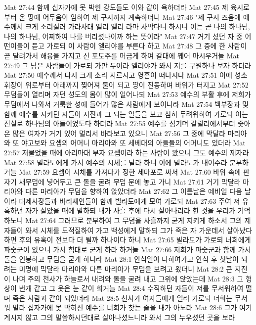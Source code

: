 Mat 27:44  함께 십자가에 못 박힌 강도들도 이와 같이 욕하더라
Mat 27:45  제 육시로부터 온 땅에 어두움이 임하여 제 구시까지 계속하더니
Mat 27:46  "제 구시 즈음에 예수께서 크게 소리질러 가라사대 엘리 엘리 라마 사박다니 하시니 이는 곧 나의 하나님, 나의 하나님, 어찌하여 나를 버리셨나이까 하는 뜻이라"
Mat 27:47  거기 섰던 자 중 어떤이들이 듣고 가로되 이 사람이 엘리야를 부른다 하고
Mat 27:48  그 중에 한 사람이 곧 달려가서 해융을 가지고 신 포도주를 머금게 하여 갈대에 꿰어 마시우거늘
Mat 27:49  그 남은 사람들이 가로되 가만 두어라 엘리야가 와서 저를 구원하나 보자 하더라
Mat 27:50  예수께서 다시 크게 소리 지르시고 영혼이 떠나시다
Mat 27:51  이에 성소 휘장이 위로부터 아래까지 찢어져 둘이 되고 땅이 진동하며 바위가 터지고
Mat 27:52  무덤들이 열리며 자던 성도의 몸이 많이 일어나되
Mat 27:53  예수의 부활 후에 저희가 무덤에서 나와서 거룩한 성에 들어가 많은 사람에게 보이니라
Mat 27:54  백부장과 및 함께 예수를 지키던 자들이 지진과 그 되는 일들을 보고 심히 두려워하여 가로되 이는 진실로 하나님의 아들이었도다 하더라
Mat 27:55  예수를 섬기며 갈릴리에서부터 좇아 온 많은 여자가 거기 있어 멀리서 바라보고 있으니
Mat 27:56  그 중에 막달라 마리아와 또 야고보와 요셉의 어머니 마리아와 또 세베대의 아들들의 어머니도 있더라
Mat 27:57  저물었을 때에 아리마대 부자 요셉이라 하는 사람이 왔으니 그도 예수의 제자라
Mat 27:58  빌라도에게 가서 예수의 시체를 달라 하니 이에 빌라도가 내어주라 분부하거늘
Mat 27:59  요셉이 시체를 가져다가 정한 세마포로 싸서
Mat 27:60  바위 속에 판 자기 새무덤에 넣어두고 큰 돌을 굴려 무덤 문에 놓고 가니
Mat 27:61  거기 막달라 마리아와 다른 마리아가 무덤을 향하여 앉았더라
Mat 27:62  그 이튿날은 예비일 다음 날이라 대제사장들과 바리새인들이 함께 빌라도에게 모여 가로되
Mat 27:63  주여 저 유혹하던 자가 살았을 때에 말하되 내가 사흘 후에 다시 살아나리라 한 것을 우리가 기억하노니
Mat 27:64  그러므로 분부하여 그 무덤을 사흘까지 굳게 지키게 하소서 그의 제자들이 와서 시체를 도적질하여 가고 백성에게 말하되 그가 죽은 자 가운데서 살아났다 하면 후의 유혹이 전보다 더 될까 하나이다 하니
Mat 27:65  빌라도가 가로되 너희에게 파숫군이 있으니 가서 힘대로 굳게 하라 하거늘
Mat 27:66  저희가 파숫군과 함께 가서 돌을 인봉하고 무덤을 굳게 하니라
Mat 28:1  안식일이 다하여가고 안식 후 첫날이 되려는 미명에 막달라 마리아와 다른 마리아가 무덤을 보려고 왔더니
Mat 28:2  큰 지진이 나며 주의 천사가 하늘로서 내려와 돌을 굴려 내고 그위에 앉았는데
Mat 28:3  그 형상이 번개 같고 그 옷은 눈 같이 희거늘
Mat 28:4  수직하던 자들이 저를 무서워하여 떨며 죽은 사람과 같이 되었더라
Mat 28:5  천사가 여자들에게 일러 가로되 너희는 무서워 말라 십자가에 못 박히신 예수를 너희가 찾는 줄을 내가 아노라
Mat 28:6  그가 여기 계시지 않고 그의 말씀하시던대로 살아나셨느니라 와서 그의 누우셨던 곳을 보라
